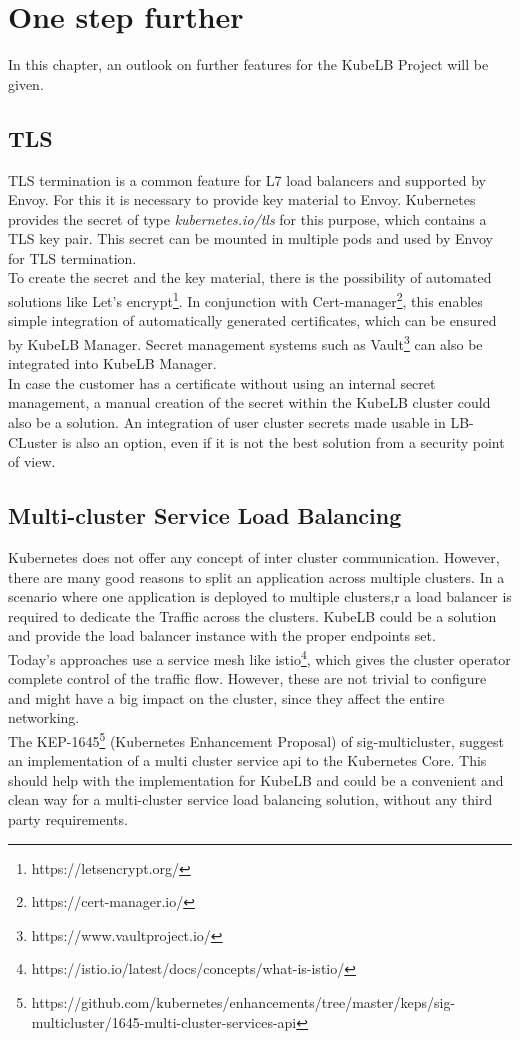 \chapter{One step further}

In this chapter, an outlook on further features for the KubeLB Project will be given.

\section{TLS}

TLS termination is a common feature for L7 load balancers and supported by Envoy.
For this it is necessary to provide key material to Envoy.
Kubernetes provides the secret of type \textit{kubernetes.io/tls} for this purpose, which contains a TLS key pair.
This secret can be mounted in multiple pods and used by Envoy for TLS termination.
\\
To create the secret and the key material, there is the possibility of automated solutions like Let's encrypt\footnote{https://letsencrypt.org/}.
In conjunction with Cert-manager\footnote{https://cert-manager.io/}, this enables simple integration of automatically generated certificates, which can be ensured by KubeLB Manager.
Secret management systems such as Vault\footnote{https://www.vaultproject.io/} can also be integrated into KubeLB Manager.
\\
In case the customer has a certificate without using an internal secret management, a manual creation of the secret within the KubeLB cluster could also be a solution.
An integration of user cluster secrets made usable in LB-CLuster is also an option, even if it is not the best solution from a security point of view.

\section{Multi-cluster Service Load Balancing}

Kubernetes does not offer any concept of inter cluster communication.
However, there are many good reasons to split an application across multiple clusters.
In a scenario where one application is deployed to multiple clusters,r a load balancer is required to dedicate the Traffic across the clusters.
KubeLB could be a solution and provide the load balancer instance with the proper endpoints set.
\\
Today's approaches use a service mesh like istio\footnote{https://istio.io/latest/docs/concepts/what-is-istio/}, which gives the cluster operator complete control of the traffic flow.
However, these are not trivial to configure and might have a big impact on the cluster, since they affect the entire networking.
\\
The KEP-1645\footnote{https://github.com/kubernetes/enhancements/tree/master/keps/sig-multicluster/1645-multi-cluster-services-api} (Kubernetes Enhancement Proposal) of sig-multicluster, suggest an implementation of a multi cluster service api to the Kubernetes Core.
This should help with the implementation for KubeLB and could be a convenient and clean way for a multi-cluster service load balancing solution, without any third party requirements.


